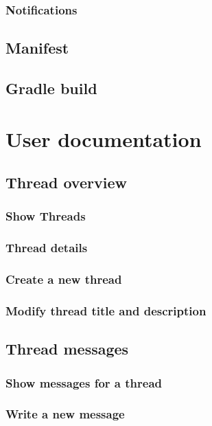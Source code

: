 \documentclass[12pt,a4paper,oneside]{report}
\begin{document}
\subsection{Notifications}

\section{Manifest}

\section{Gradle build}

\chapter{User documentation}

\section{Thread overview}

\subsection{Show Threads}

\subsection{Thread details}

\subsection{Create a new thread}

\subsection{Modify thread title and description}

\section{Thread messages}

\subsection{Show messages for a thread}

\subsection{Write a new message}
\end{document}
